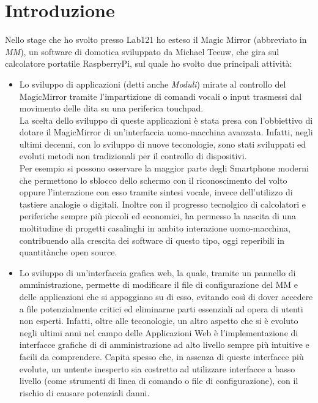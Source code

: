 \chapter*{Introduzione}

Nello stage che ho svolto presso Lab121 ho esteso il Magic Mirror (abbreviato in \emph{MM}), un software di domotica sviluppato da Michael Teeuw,
che gira sul calcolatore portatile RaspberryPi\cite{Raspberry}, sul quale ho svolto due principali attivit\`a:\\
\begin{itemize}
\item Lo sviluppo di applicazioni (detti anche \emph{Moduli}) mirate al controllo del
MagicMirror tramite l'impartizione di comandi vocali o input trasmessi dal movimento delle dita su
una periferica touchpad.\\
La scelta dello sviluppo di queste applicazioni è stata presa con l'obbiettivo di dotare il
MagicMirror di un'interfaccia uomo-macchina avanzata. Infatti, negli ultimi decenni, con lo sviluppo
di nuove teconologie, sono stati sviluppati ed evoluti metodi non tradizionali per il controllo di dispositivi.\\
Per esempio si possono osservare la maggior parte degli Smartphone moderni che permettono lo sblocco dello schermo con
il riconoscimento del volto oppure l'interazione con esso tramite sintesi vocale,
invece dell'utilizzo di tastiere analogie o digitali.
Inoltre con il progresso tecnolgico di calcolatori e periferiche sempre pi\`u piccoli ed economici, ha permesso
la nascita di una moltitudine di progetti casalinghi in ambito interazione uomo-macchina, contribuendo
alla crescita dei software di questo tipo, oggi reperibili in quantit\` anche open source.\\[1\baselineskip]
\item Lo sviluppo di un'interfaccia grafica web, la quale, tramite un pannello di amministrazione,
 permette di modificare il file di configurazione del MM e delle applicazioni che si appoggiano su di esso,
evitando così di dover accedere
a file potenzialmente critici ed eliminarne parti essenziali ad opera di utenti non esperti.
Infatti, oltre alle teconologie, un altro aspetto che si \`e evoluto negli ultimi anni
nel campo delle Applicazioni Web è l'implementazione di interfacce grafiche di di amministrazione
ad alto livello sempre pi\`u intuitive e facili da comprendere.
Capita spesso che, in assenza di queste interfacce più evolute, un untente inesperto sia
costretto ad utilizzare interfacce a basso livello (come strumenti di linea di comando o file
di configurazione), con il rischio di causare potenziali danni.\\[2\baselineskip]
\end{itemize}

